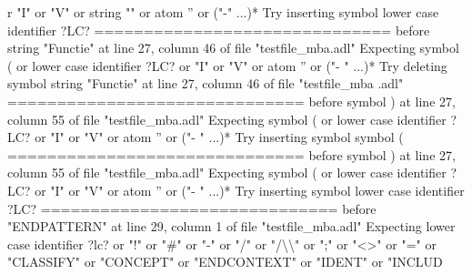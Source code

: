 {  r "I" or "V" or string "" or atom '' or ("-" ...)*\newline
  Try inserting symbol lower case identifier ?LC?\newline
  \newline
  ==============================\newline
  \newline
  before string "Functie" at line 27, column 46 of file "testfile\_mba.adl"\newline
  Expecting symbol ( or lower case identifier ?LC? or "I" or "V" or atom '' or ("-\newline
  " ...)*\newline
  Try deleting symbol string "Functie" at line 27, column 46 of file "testfile\_mba\newline
  .adl"\newline
  \newline
  ==============================\newline
  \newline
  before symbol ) at line 27, column 55 of file "testfile\_mba.adl"\newline
  Expecting symbol ( or lower case identifier ?LC? or "I" or "V" or atom '' or ("-\newline
  " ...)*\newline
  Try inserting symbol symbol (\newline
  \newline
  ==============================\newline
  \newline
  before symbol ) at line 27, column 55 of file "testfile\_mba.adl"\newline
  Expecting symbol ( or lower case identifier ?LC? or "I" or "V" or atom '' or ("-\newline
  " ...)*\newline
  Try inserting symbol lower case identifier ?LC?\newline
  \newline
  ==============================\newline
  \newline
  before "ENDPATTERN" at line 29, column 1 of file "testfile\_mba.adl"\newline
  Expecting lower case identifier ?lc? or "!" or "\#" or "-" or "/" or "/\textbackslash{}\textbackslash{}" or ";"\newline
   or "<>" or "=" or "CLASSIFY" or "CONCEPT" or "ENDCONTEXT" or "IDENT" or "INCLUD\newline
}
